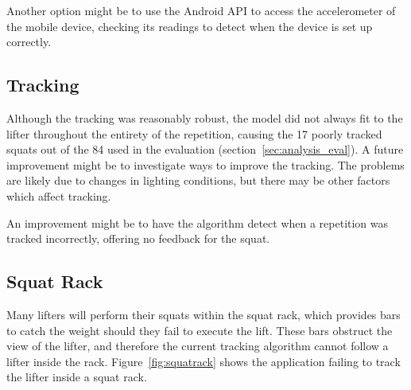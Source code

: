 Another option might be to use the Android API to access the accelerometer of the mobile device, checking its readings to detect when the device is set up correctly.

\subsection{Tracking}

Although the tracking was reasonably robust, the model did not always fit to the lifter throughout the entirety of the repetition, causing the 17 poorly tracked squats out of the 84 used in the evaluation (section~\ref{sec:analysis_eval}). A future improvement might be to investigate ways to improve the tracking. The problems are likely due to changes in lighting conditions, but there may be other factors which affect tracking.

An improvement might be to have the algorithm detect when a repetition was tracked incorrectly, offering no feedback for the squat.

\subsection{Squat Rack}

Many lifters will perform their squats within the squat rack, which provides bars to catch the weight should they fail to execute the lift. These bars obstruct the view of the lifter, and therefore the current tracking algorithm cannot follow a lifter inside the rack. Figure~\ref{fig:squatrack} shows the application failing to track the lifter inside a squat rack.

